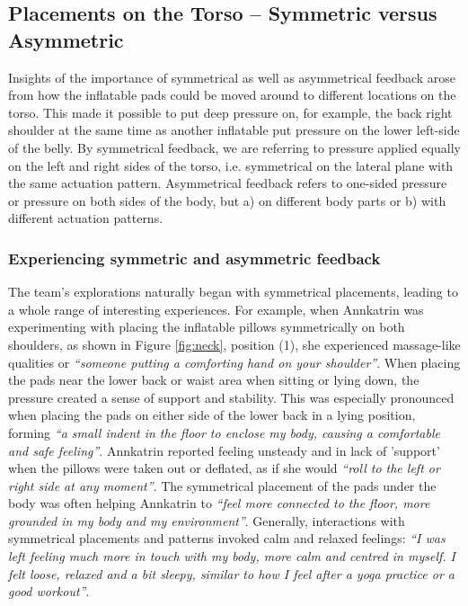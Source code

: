 \subsection*{Placements on the Torso -- Symmetric versus Asymmetric}

Insights of the importance of symmetrical as well as asymmetrical feedback arose from how the inflatable pads could be moved around to different locations on the torso. This made it possible to put deep pressure on, for example, the back right shoulder at the same time as another inflatable put pressure on the lower left-side of the belly. By symmetrical feedback, we are referring to pressure applied equally on the left and right sides of the torso, i.e. symmetrical on the lateral plane with the same actuation pattern. Asymmetrical feedback refers to one-sided pressure or pressure on both sides of the body, but a) on different body parts or b) with different actuation patterns.


\subsubsection*{Experiencing symmetric and asymmetric feedback}

The team's explorations naturally began with symmetrical placements, leading to a whole range of interesting experiences. For example, when Annkatrin was experimenting with placing the inflatable pillows symmetrically on both shoulders, as shown in Figure \ref{fig:neck}, position (1), she experienced massage-like qualities or \textit{``someone putting a comforting hand on your shoulder''}. When placing the pads near the lower back or waist area when sitting or lying down, the pressure created a sense of support and stability. This was especially pronounced when placing the pads on either side of the lower back in a lying position, forming \textit{``a small indent in the floor to enclose my body, causing a comfortable and safe feeling''}. Annkatrin reported feeling unsteady and in lack of 'support' when the pillows were taken out or deflated, as if she would \textit{``roll to the left or right side at any moment''}. The symmetrical placement of the pads under the body was often helping Annkatrin to \textit{``feel more connected to the floor, more grounded in my body and my environment''}. Generally, interactions with symmetrical placements and patterns invoked calm and relaxed feelings: \textit{``I was left feeling much more in touch with my body, more calm and centred in myself. I felt loose, relaxed and a bit sleepy, similar to how I feel after a yoga practice or a good workout''}.

